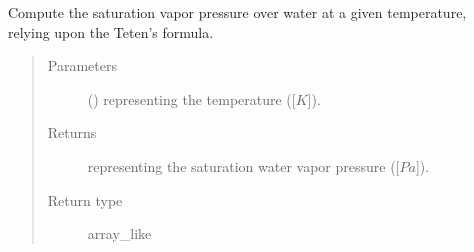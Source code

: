 \documentclass[letterpaper,10pt,english]{sphinxmanual}
\begin{document}
\begin{fulllineitems}
\label{\detokenize{api:tasmania.utils.utils_meteo.apply_teten_formula}}
Compute the saturation vapor pressure over water at a given temperature, relying upon the Teten’s formula.
\begin{quote}\begin{description}
\item[{Parameters}] \leavevmode
{} () \textendash{}  representing the temperature ({[}\(K\){]}).

\item[{Returns}] \leavevmode
{} representing the saturation water vapor pressure ({[}\(Pa\){]}).

\item[{Return type}] \leavevmode
array\_like

\end{description}\end{quote}

\end{fulllineitems}

\end{document}
